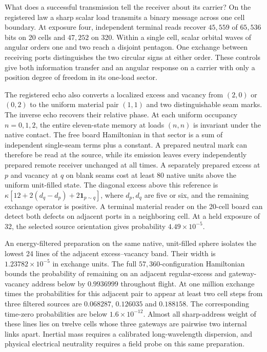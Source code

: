 What does a successful transmission tell the receiver about its carrier?
On the registered law a sharp scalar load transmits a binary message across
one cell boundary. At exposure four, independent terminal reads recover
$45{,}559$ of $65{,}536$ bits on 20 cells and $47{,}252$ on 320.
Within a single cell, scalar orbital waves of angular orders one and two
reach a disjoint pentagon. One exchange between receiving ports distinguishes
the two circular signs at either order. These controls give both information
transfer and an angular response on a carrier with only a position degree
of freedom in its one-load sector.

The registered echo also converts a localized excess and vacancy from
$(2,0)$ or $(0,2)$ to the uniform material pair $(1,1)$ and two
distinguishable seam marks. The inverse echo recovers their relative phase.
At each uniform occupancy $n=0,1,2$, the entire eleven-state memory
at loads $(n,n)$ is invariant under the native contact. The free board
Hamiltonian in that sector is a sum of independent single-seam terms plus
a constant. A prepared neutral mark can therefore be read at the source,
while its emission leaves every independently prepared remote receiver
unchanged at all times. A separately prepared excess at $p$ and vacancy at
$q$ on blank seams cost at least $80$ native units above the uniform
unit-filled state. The diagonal excess above this reference is
$\kappa[12+2(d_q-d_p)+2\mathbf{1}_{p\sim q}]$, where $d_p,d_q$ are
five or six, and the remaining exchange operator is positive.
A terminal material reader on the 20-cell board can detect both defects
on adjacent ports in a neighboring cell. At a held exposure of 32, the
selected source orientation gives probability $4.49\times10^{-5}$.

An energy-filtered preparation on the same native, unit-filled sphere
isolates the lowest 24 lines of the adjacent excess--vacancy band.
Their width is $1.23782\times10^{-5}$ in exchange units. The full
$57{,}360$-configuration Hamiltonian bounds the probability of remaining
on an adjacent regular-excess and gateway-vacancy address below by
$0.9936999$ throughout flight. At one million exchange times the
probabilities for this adjacent pair to appear at least two cell steps
from three filtered sources are $0.068287$, $0.126035$ and $0.188158$.
The corresponding time-zero probabilities are below $1.6\times10^{-12}$.
Almost all sharp-address weight of these lines lies on twelve cells whose
three gateways are pairwise two internal links apart. Inertial mass requires
a calibrated long-wavelength dispersion, and physical electrical neutrality
requires a field probe on this same preparation.

